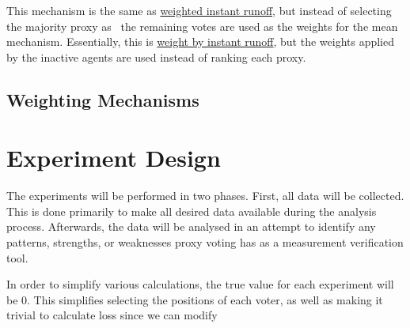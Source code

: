 This mechanism is the same as
\hyperref[para:candidate-weighted-instant-runoff]{weighted instant runoff},
but instead of selecting the majority proxy as \systemtruth\ the remaining votes
are used as the weights for the mean mechanism.
Essentially, this is
\hyperref[para:avg-instant-runoff]{weight by instant runoff}, but the weights
applied by the inactive agents are used instead of ranking each proxy.


\subsection{Weighting Mechanisms}\label{subsec:weighting-mechanisms}
%



\section{Experiment Design}\label{sec:experiment-design}
%
%

The experiments will be performed in two phases.
First, all data will be collected.
This is done primarily to make all desired data available during the analysis
process.
Afterwards, the data will be analysed in an attempt to identify any patterns,
strengths, or weaknesses proxy voting has as a measurement verification tool.

In order to simplify various calculations, the true value for each experiment
will be 0.
This simplifies selecting the positions of each voter, as well as making it
trivial to calculate loss since we can modify


